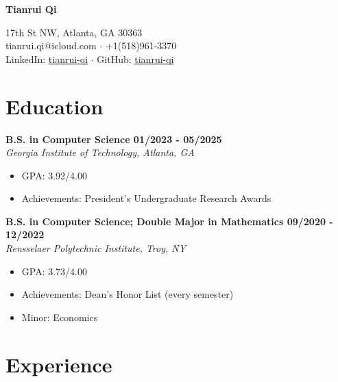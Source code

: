 \documentclass[letterpaper, 11pt]{article}
\newcommand{\subsectionvspace}{\vspace{8pt}}
\begin{document}
\begin{minipage}[t]{0.3\textwidth}
    \vspace*{0\baselineskip}\textbf{\huge Tianrui Qi}
\end{minipage}%
\begin{minipage}[t]{0.7\textwidth}
     17th St NW, Atlanta, GA 30363
    \\
    tianrui.qi@icloud.com 
    $\cdot$ 
    +1(518)961-3370
    \\
    LinkedIn: \href{https://www.linkedin.com/in/tianrui-qi/}{tianrui-qi}
    $\cdot$
    GitHub: \href{https://github.com/tianrui-qi}{tianrui-qi}
\end{minipage}


\section{Education}


    \textbf{B.S. in Computer Science \hfill 01/2023 - 05/2025} \\
    \textit{Georgia Institute of Technology, Atlanta, GA}
    \begin{itemize}
        \item GPA: 3.92/4.00
        \item Achievements: President's Undergraduate Research Awards
    \end{itemize}

    \subsectionvspace

    \textbf{B.S. in Computer Science; Double Major in Mathematics \hfill 09/2020 - 12/2022} \\
    \textit{Rensselaer Polytechnic Institute, Troy, NY}
    \begin{itemize}
        \item GPA: 3.73/4.00
        \item Achievements: Dean's Honor List (every semester)
        \item Minor: Economics
    \end{itemize}


\section{Experience}
\end{document}
